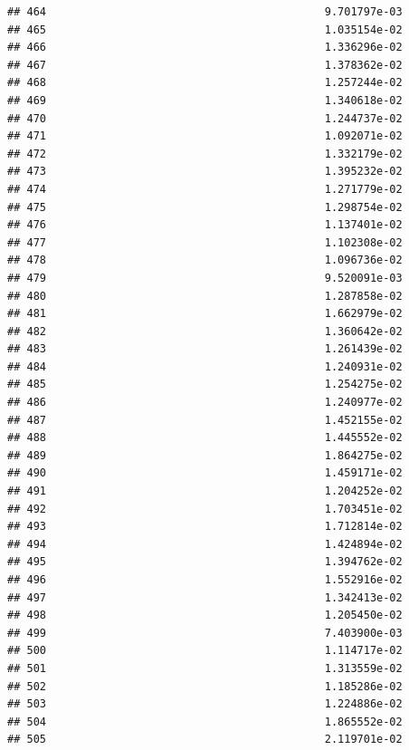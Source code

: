 \documentclass[
]{article}
\begin{document}
\begin{verbatim}
## 464                                           9.701797e-03
## 465                                           1.035154e-02
## 466                                           1.336296e-02
## 467                                           1.378362e-02
## 468                                           1.257244e-02
## 469                                           1.340618e-02
## 470                                           1.244737e-02
## 471                                           1.092071e-02
## 472                                           1.332179e-02
## 473                                           1.395232e-02
## 474                                           1.271779e-02
## 475                                           1.298754e-02
## 476                                           1.137401e-02
## 477                                           1.102308e-02
## 478                                           1.096736e-02
## 479                                           9.520091e-03
## 480                                           1.287858e-02
## 481                                           1.662979e-02
## 482                                           1.360642e-02
## 483                                           1.261439e-02
## 484                                           1.240931e-02
## 485                                           1.254275e-02
## 486                                           1.240977e-02
## 487                                           1.452155e-02
## 488                                           1.445552e-02
## 489                                           1.864275e-02
## 490                                           1.459171e-02
## 491                                           1.204252e-02
## 492                                           1.703451e-02
## 493                                           1.712814e-02
## 494                                           1.424894e-02
## 495                                           1.394762e-02
## 496                                           1.552916e-02
## 497                                           1.342413e-02
## 498                                           1.205450e-02
## 499                                           7.403900e-03
## 500                                           1.114717e-02
## 501                                           1.313559e-02
## 502                                           1.185286e-02
## 503                                           1.224886e-02
## 504                                           1.865552e-02
## 505                                           2.119701e-02

\end{verbatim}
\end{document}
